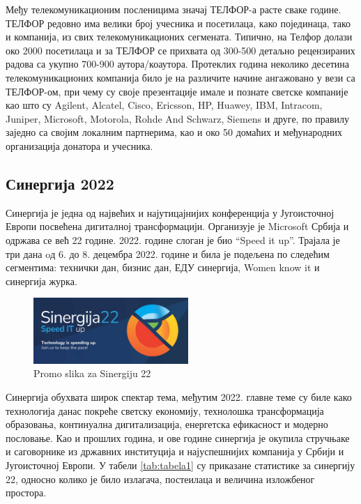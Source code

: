 \documentclass[12pt]{article}
\begin{document}
Међу телекомуникационим посленицима значај ТЕЛФОР-а расте сваке године. ТЕЛФОР редовно има велики број учесника и посетилаца, како појединаца, тако и компанија, из свих телекомуникационих сегмената. Типично, на Телфор долази око 2000 посетилаца и за ТЕЛФОР се прихвата од 300-500 детаљно рецензираних радова са укупно 700-900 аутора/коаутора. Протеклих година неколико десетина телекомуникационих компанија било је на различите начине ангажовано у вези са ТЕЛФОР-ом, при чему су своје презентације имале и познате светске компаније као што су Agilent, Alcatel, Cisco, Ericsson, HP, Huawey, IBM, Intracom, Juniper, Microsoft, Motorola, Rohde And Schwarz, Siemens и друге, по правилу заједно са својим локалним партнерима, као и око 50 домаћих и међународних организација донатора и учесника.\cite{telfor}

\subsection{Синергија 2022}
Синергија је једна од највећих и најутицајнијих конференција у Југоисточној Европи посвећена дигиталној трансформацији. Организује је Microsoft Србија и одржава се већ 22 године. 2022. године слоган је био “Speed it up”. Трајала је три дана oд 6. до 8. децембра 2022. године и била је подељена по следећим сегментима: технички дан, бизнис дан, ЕДУ синергија, Women know it и синергија журка.

\begin{figure}[h!]
        \centering\includegraphics[height=2.5cm]{slike/sinergija.jpg} 
        \caption{Promo slika za Sinergiju 22}
        \label{fig:sinergija22}
\end{figure}

Синергија обухвата широк спектар тема, међутим 2022. главне теме су биле како технологија данас покреће светску економију, технолошка трансформација образовања, континуална дигитализација, енергетска ефикасност и модерно пословање. Као и прошлих година, и ове године синергија је окупила стручњаке и саговорнике из државних институција и најуспешнијих компанија у Србији и Југоисточној Европи. У табели \ref{tab:tabela1} су приказане статистике за синергију 22, односно колико је било излагача, постеилаца и величина изложбеног простора.\cite{sinergija}
\end{document}

